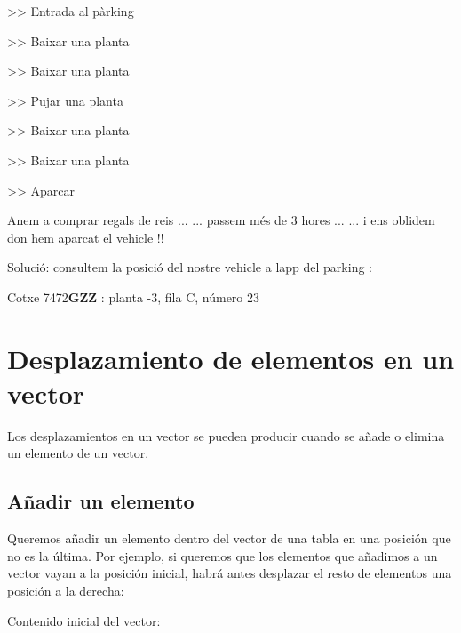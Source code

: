 \documentclass[
]{book}
\newenvironment{Shaded}{\begin{snugshade}}{\end{snugshade}}
\newcommand{\DecValTok}[1]{\textcolor[rgb]{0.00,0.00,0.81}{#1}}
\newcommand{\ErrorTok}[1]{\textcolor[rgb]{0.64,0.00,0.00}{\textbf{#1}}}
\newcommand{\NormalTok}[1]{#1}
\begin{document}
\begin{Shaded}
\begin{Highlighting}[]
\NormalTok{\textgreater{}\textgreater{} Entrada al pàrking }

\NormalTok{\textgreater{}\textgreater{} Baixar una planta}

\NormalTok{\textgreater{}\textgreater{} Baixar una planta}

\NormalTok{\textgreater{}\textgreater{} Pujar una planta}

\NormalTok{\textgreater{}\textgreater{} Baixar una planta}

\NormalTok{\textgreater{}\textgreater{} Baixar una planta}

\NormalTok{\textgreater{}\textgreater{} Aparcar}

\NormalTok{Anem a comprar regals de reis ...}
\NormalTok{... passem més de }\DecValTok{3}\NormalTok{ hores ...}
\NormalTok{... i ens oblidem d\textquotesingle{}on hem aparcat el vehicle !!}

\NormalTok{Solució: consultem la posició del nostre vehicle }
\NormalTok{a l\textquotesingle{}app del parking : }

\NormalTok{Cotxe }\DecValTok{7472}\ErrorTok{GZZ}\NormalTok{ : planta {-}}\DecValTok{3}\NormalTok{, fila C, número }\DecValTok{23}
\end{Highlighting}
\end{Shaded}

\hypertarget{desplazamiento-de-elementos-en-un-vector}{%
\section{Desplazamiento de elementos en un vector}\label{desplazamiento-de-elementos-en-un-vector}}

Los desplazamientos en un vector se pueden producir cuando se añade o elimina un elemento de un vector.

\hypertarget{auxf1adir-un-elemento}{%
\subsection{Añadir un elemento}\label{auxf1adir-un-elemento}}

Queremos añadir un elemento dentro del vector de una tabla en una posición que no es la última. Por ejemplo, si queremos que los elementos que añadimos a un vector vayan a la posición inicial, habrá antes desplazar el resto de elementos una posición a la derecha:

Contenido inicial del vector:
\end{document}
